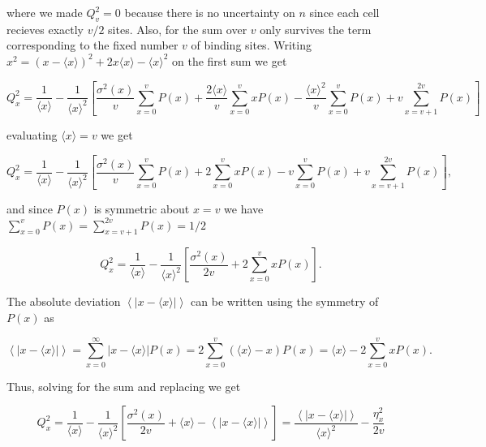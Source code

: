 where we made $Q_v^2=0$ because there is no uncertainty on $n$ since each cell recieves exactly $v/2$ sites. Also, for the sum over $v$ only survives the term corresponding to the fixed number $v$ of binding sites. Writing $x^2 = \left(x-\langle x\rangle\right)^2 + 2x\langle x\rangle - \langle x\rangle^2$ on the first sum we get 

\begin{equation*}
  Q_x^2 = \frac{1}{\langle x\rangle}-\frac{1}{\langle x\rangle^2}\left[\frac{\sigma^2(x)}{v}\sum_{x=0}^vP(x)+\frac{2\langle x\rangle}{v}\sum_{x=0}^vxP(x)-\frac{\langle x\rangle^2}{v}\sum_{x=0}^vP(x)+v\sum_{x=v+1}^{2v}P(x)\right]
\end{equation*}

evaluating $\langle x\rangle = v$ we get

\begin{equation*}
  Q_x^2 = \frac{1}{\langle x\rangle}-\frac{1}{\langle x\rangle^2}\left[\frac{\sigma^2(x)}{v}\sum_{x=0}^vP(x)+2\sum_{x=0}^vxP(x)-v\sum_{x=0}^vP(x)+v\sum_{x=v+1}^{2v}P(x)\right],
\end{equation*}

and since $P(x)$ is symmetric about $x=v$ we have $\sum_{x=0}^vP(x) = \sum_{x=v+1}^{2v}P(x) = 1/2$

\begin{equation}
  Q_x^2 = \frac{1}{\langle x\rangle}-\frac{1}{\langle x\rangle^2}\left[\frac{\sigma^2(x)}{2v}+2\sum_{x=0}^vxP(x)\right].
\end{equation}

The absolute deviation $\left\langle\left|x-\langle x\rangle\right|\right\rangle$ can be written using the symmetry of $P(x)$ as

\begin{equation}
  \left\langle\left|x-\langle x\rangle\right|\right\rangle = \sum_{x=0}^\infty\left|x-\langle x\rangle\right|P(x) = 2\sum_{x=0}^v\left(\langle x\rangle-x\right)P(x) = \langle x\rangle-2\sum_{x=0}^vxP(x).
\end{equation}

Thus, solving for the sum and replacing we get

\begin{equation*}
  Q_x^2 = \frac{1}{\langle x\rangle}-\frac{1}{\langle x\rangle^2}\left[\frac{\sigma^2(x)}{2v}+\langle x\rangle-\left\langle\left|x-\langle x\rangle\right|\right\rangle\right] = \frac{\left\langle\left|x-\langle x\rangle\right|\right\rangle}{\langle x\rangle^2}-\frac{\eta_x^2}{2v}
\end{equation*}

